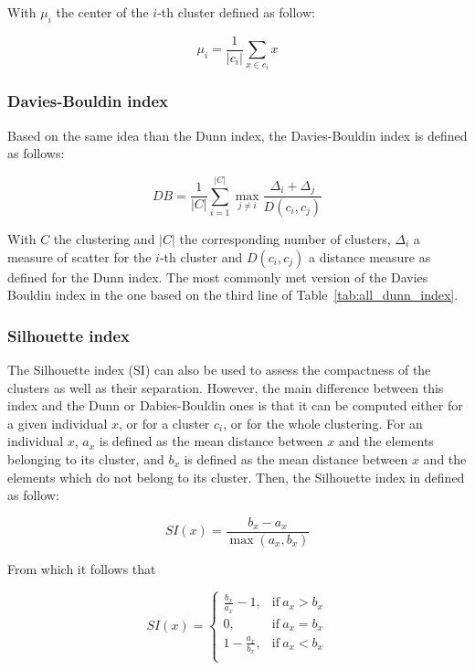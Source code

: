     With $\mu_i$ the center of the $i$-th cluster defined as follow:

    \begin{equation}
        \mu_i = \frac{1}{|c_i|}\sum_{x \in c_i}x
        \label{eq:mui}
    \end{equation}

    \subsubsection{Davies-Bouldin index}
    Based on the same idea than the Dunn index, the Davies-Bouldin index is defined as follows:

    \begin{equation}
DB = \frac{1}{|C|}\sum_{i=1}^{|C|} \max_{j \neq i} \frac{\Delta_i + \Delta_j}{D(c_i,c_j)}
        \label{eq:db_index}
    \end{equation}

    With $C$ the clustering and $|C|$ the corresponding number of clusters, $\Delta_i$ a measure of scatter for the $i$-th cluster and $D(c_i, c_j)$ a distance measure as defined for the Dunn index. The most commonly met version of the Davies Bouldin index in the one based on the third line of Table~\ref{tab:all_dunn_index}.

    \subsubsection{Silhouette index}
    The Silhouette index (SI) can also be used to assess the compactness of the clusters as well as their separation. However, the main difference between this index and the Dunn or Dabies-Bouldin ones is that it can be computed either for a given individual $x$, or for a cluster $c_i$, or for the whole clustering. For an individual $x$, $a_x$ is defined as the mean distance between $x$ and the elements belonging to its cluster, and $b_x$ is defined as the mean distance between $x$ and the elements which do not belong to its cluster. Then, the Silhouette index in defined as follow:

    \begin{equation}
        SI(x) = \frac{b_x - a_x}{\max(a_x, b_x)}
        \label{eq:si_x}
    \end{equation}

    From which it follows that 

    \begin{equation}
        SI(x) = 
        \begin{cases}
            \frac{b_x}{a_x} - 1, & \text{if}\ a_x > b_x \\
            0, & \text{if}\ a_x = b_x \\
            1 - \frac{a_x}{b_x}, & \text{if}\ a_x < b_x \\
        \end{cases}
        \label{eq:si_x_detail}
    \end{equation}

